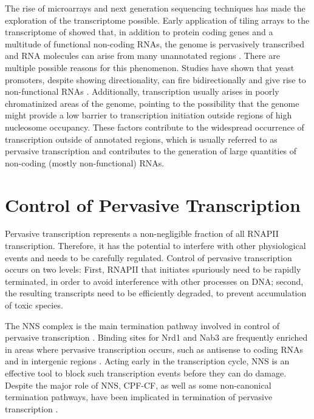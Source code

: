 

The rise of microarrays and next generation sequencing techniques has made the exploration of the transcriptome possible. 
Early application of tiling arrays to the transcriptome of \cer{} showed that, in addition to protein coding genes and a multitude of functional non-coding RNAs, the genome is pervasively transcribed and RNA molecules can arise from many unannotated regions \cite{xu:2009:bidirectional, neil:2009:widespread,david:2006:highresolution}. 
There are multiple possible reasons for this phenomenon. 
Studies have shown that yeast promoters, despite showing directionality, can fire bidirectionally and give rise to non-functional RNAs \cite{xu:2009:bidirectional, neil:2009:widespread}. 
Additionally, transcription usually arises in poorly chromatinized areas of the genome, pointing to the possibility that the genome might provide a low barrier to transcription initiation outside regions of high nucleosome occupancy. 
These factors contribute to the widespread occurrence of transcription outside of annotated regions, which is usually referred to as pervasive transcription and contributes to the generation of large quantities of non-coding (mostly non-functional) RNAs. 

\section{Control of Pervasive Transcription}

Pervasive transcription represents a non-negligible fraction of all RNAPII transcription. 
Therefore, it has the potential to interfere with other physiological events and needs to be carefully regulated. 
Control of pervasive transcription occurs on two levels: First, RNAPII that initiates spuriously need to be rapidly terminated, in order to avoid interference with other processes on DNA; second, the resulting transcripts need to be efficiently degraded, to prevent accumulation of toxic species. 

The NNS complex is the main termination pathway involved in control of pervasive transcription \cite{arigo:2006:regulation, thiebaut:2006:transcription}. 
Binding sites for Nrd1 and Nab3 are frequently enriched in areas where pervasive transcription occurs, such as antisense to coding RNAs and in intergenic regions \cite{thiebaut:2006:transcription}. 
Acting early in the transcription cycle, NNS is an effective tool to block such transcription events before they can do damage. 
Despite the major role of NNS, CPF-CF, as well as some non-canonical termination pathways, have been implicated in termination of pervasive transcription \cite{marquardt:2011:distinct, vandijk:2011:xuts,colin:2014:roadblock}.

